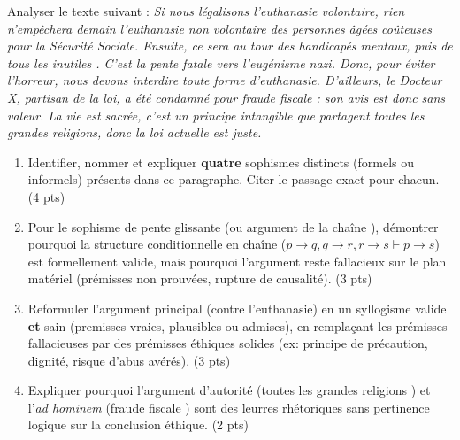 \documentclass[11pt]{article}
\begin{document}
\begin{exercice}
Analyser le texte suivant : \og \textit{Si nous légalisons l'euthanasie volontaire, rien n'empêchera demain l'euthanasie non volontaire des personnes âgées coûteuses pour la Sécurité Sociale. Ensuite, ce sera au tour des handicapés mentaux, puis de tous les \og inutiles \fg{}. C'est la pente fatale vers l'eugénisme nazi. Donc, pour éviter l'horreur, nous devons interdire toute forme d'euthanasie. D'ailleurs, le Docteur X, partisan de la loi, a été condamné pour fraude fiscale : son avis est donc sans valeur. La vie est sacrée, c'est un principe intangible que partagent toutes les grandes religions, donc la loi actuelle est juste.} \fg{}
\begin{enumerate}
    \item Identifier, nommer et expliquer \textbf{quatre} sophismes distincts (formels ou informels) présents dans ce paragraphe. Citer le passage exact pour chacun. (4 pts)
    \item Pour le sophisme de \og pente glissante \fg{} (ou \og argument de la chaîne \fg{}), démontrer pourquoi la structure conditionnelle en chaîne ($p \to q, q \to r, r \to s \vdash p \to s$) est formellement valide, mais pourquoi l'argument reste fallacieux sur le plan matériel (prémisses non prouvées, rupture de causalité). (3 pts)
    \item Reformuler l'argument principal (contre l'euthanasie) en un syllogisme valide \textbf{et} sain (premisses vraies, plausibles ou admises), en remplaçant les prémisses fallacieuses par des prémisses éthiques solides (ex: principe de précaution, dignité, risque d'abus avérés). (3 pts)
    \item Expliquer pourquoi l'argument d'autorité (\og toutes les grandes religions \fg{}) et l'\textit{ad hominem} (\og fraude fiscale \fg{}) sont des leurres rhétoriques sans pertinence logique sur la conclusion éthique. (2 pts)
\end{enumerate}
\end{exercice}
\vspace{8pt}
\end{document}
